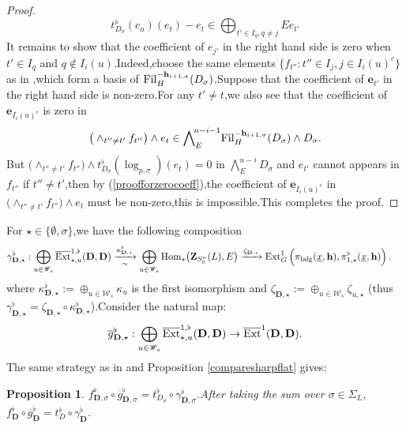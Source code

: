 \documentclass[10pt]{article}
\newtheorem{pro}[thm]{Proposition}
\newcommand{\fil}{{\rm Fil}}
\newcommand{\homo}{{\rm Hom}}
\newcommand{\ext}{{\rm Ext}}
\newcommand{\lalg}{{\rm lalg}}
\newcommand{\Dpik}{{\mathbf{D}}}
\newcommand{\be}{{\mathbf{e}}}
\newcommand{\bZ}{{\mathbf{Z}}}
\newcommand{\bh}{{\mathbf{h}}}
\newcommand{\sW}{\mathscr W}
\begin{document}
\begin{proof}
\begin{equation}\label{proofforzerocoeff}
	t^{\flat}_{D_{\sigma}}(c_u)(e_t)-e_t\in\bigoplus_{t'\in I_{q},q\neq j}Ee_{t'}
\end{equation}
It remains to show that the coefficient of $e_{j'}$ in the right hand side is zero when $t'\in I_{q}$ and $q\not\in I_i(u)$.\;Indeed,\;choose the same elements $\{f_{t''}:{t''}\in I_j,j\in I_i(u)^c\}$ as in  \cite[(84)]{BDcritical25},\;which form a basis of $\fil_H^{-\bh_{i+1,\sigma}}(D_{\sigma})$.\;Suppose that the coefficient of $\be_{t'}$ in the right hand side is non-zero.\;For any $t'\neq t$,\;we also see that the coefficient of $\be_{I_{i}(u)^c}$ is zero in 
\[\big(\wedge_{t''\neq t'}f_{t''}\big)\wedge e_t\in \bigwedge\nolimits_E^{\!n-i-1}\!\fil_H^{-\bh_{i+1,\sigma}}(D_{\sigma})\wedge D_{\sigma}.\]
But $\big(\wedge_{t''\neq t'}f_{t''}\big)\wedge t^{\flat}_{D_{\sigma}}(\log_{p,\sigma})(e_t)=0$ in $\bigwedge\nolimits_E^{\!n-i}\!D_{\sigma}$ and $e_{t'}$ cannot appears in $f_{t''}$ if $t''\neq t'$,\;then by (\ref{proofforzerocoeff}),\;the coefficient of $\be_{I_{i}(u)^c}$ in $\big(\wedge_{t''\neq t'}f_{t''}\big)\wedge e_t$ must be non-zero,\;this is impossible.\;This completes the proof.\;
\end{proof} 

For $\star\in\{\emptyset,\sigma\}$,\;we  have the following composition 
\begin{equation}\label{dfnforgammaD}
	\begin{aligned}
		\gamma^{\flat}_{\Dpik,\star}:\bigoplus_{u\in\sW_s}\overline{\ext}^{1,\flat}_{\star,u}(\Dpik,\Dpik)
		&\xrightarrow[\sim]{\kappa^{\flat}_{\Dpik,\star}} \bigoplus_{u\in\sW_s}\homo_{\star}\big(\bZ_{S^u_0}(L),E\big)
		\xrightarrow{\zeta_{\Dpik,\star}} \ext^1_{G}\left(\pi_{\lalg}(\underline{x},\bh),\pi^{\flat}_{1,\star}(\underline{x},\bh)\right).\;
	\end{aligned}
\end{equation}
where $\kappa^{\flat}_{\Dpik,\star}:=\oplus_{u\in\sW_s}\kappa_{u}$ is the first isomorphism and $\zeta_{\Dpik,\star}:=\oplus_{u\in\sW_s}\zeta_{u,\star}$ (thus $\gamma^{\flat}_{\Dpik,\star}=\zeta_{\Dpik,\star}\circ \kappa^{\flat}_{\Dpik,\star}$).\;Consider the natural map:
\[\overline{g}^{\flat}_{\Dpik,\star}:\bigoplus_{u\in\sW_s}\overline{\ext}^{1,\flat}_{\star,u}(\Dpik,\Dpik)\rightarrow \overline{\ext}^{1}(\Dpik,\Dpik).\]
The same strategy as in   \cite[Proposition 2.5.5,\;Corollary 2.5.6]{BDcritical25} and Proposition \ref{comparesharpflat} gives:
\begin{pro}\label{mainthmforfullrefine} $f^{\flat}_{\Dpik,\sigma}\circ\overline{g}^{\flat}_{\Dpik,\sigma}=t^{\flat}_{D_{\sigma}}\circ\gamma^{\flat}_{\Dpik,\sigma}$.\;After taking the sum over $\sigma\in \Sigma_L$,\;$f^{\flat}_{\Dpik}\circ\overline{g}^{\flat}_{\Dpik}=t^{\flat}_{D}\circ\gamma^{\flat}_{\Dpik}$.\;
\end{pro}
\end{document}
